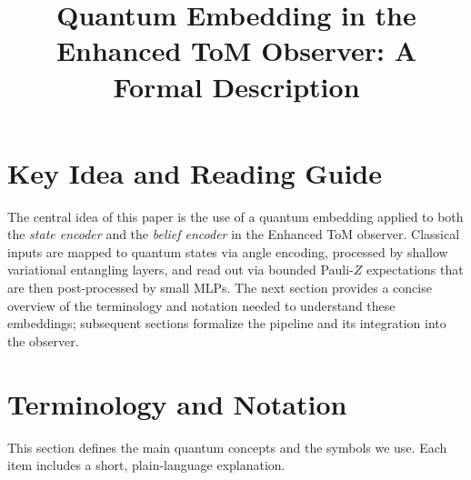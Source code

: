 \documentclass[11pt]{article}
\title{Quantum Embedding in the Enhanced ToM Observer: A Formal Description}
\author{}
\date{}
\begin{document}
\maketitle

\section{Key Idea and Reading Guide}

The central idea of this paper is the use of a quantum embedding applied to both the \emph{state encoder} and the \emph{belief encoder} in the Enhanced ToM observer. Classical inputs are mapped to quantum states via angle encoding, processed by shallow variational entangling layers, and read out via bounded Pauli-$Z$ expectations that are then post-processed by small MLPs. The next section provides a concise overview of the terminology and notation needed to understand these embeddings; subsequent sections formalize the pipeline and its integration into the observer.

\section{Terminology and Notation}

This section defines the main quantum concepts and the symbols we use. Each item includes a short, plain-language explanation.
\end{document}
